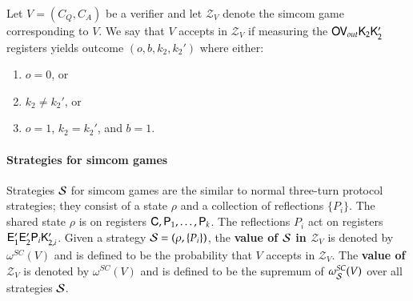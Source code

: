 Let $V = (C_Q,C_A)$ be a verifier and let $\mathscr{Z}_V$ denote the simcom game corresponding to $V$. We say that $V$ accepts in $\mathscr{Z}_V$ if measuring the ${\mathsf{O}} {\mathsf{V}}_{out} {\mathsf{K}}_2 {\mathsf{K}}_2'$ registers yields outcome $(o,b,k_2,k_2')$ where either:
\begin{enumerate}
	\item $o = 0$, or
	\item $k_2 \neq k_2'$, or
	\item $o = 1$, $k_2 = k_2'$, and $b = 1$.
\end{enumerate}

\paragraph{Strategies for simcom games} Strategies $\mathcal{S}$ for simcom games are the similar to normal three-turn protocol strategies; they consist of a state $\rho$ and a collection of reflections $\{ P_i \}$. The shared state $\rho$ is on registers ${\mathsf{C}}, {\mathsf{P}}_1,\ldots,{\mathsf{P}}_k$. The reflections $P_i$ act on registers ${\mathsf{E}}_1' {\mathsf{E}}_2' {\mathsf{P}}_i {\mathsf{K}}_{2,i}'$. Given a strategy $\mathcal{S} = (\rho,\{P_i\})$, the \textbf{value of $\mathcal{S}$ in $\mathscr{Z}_V$} is denoted by $\omega^{SC}(V)$ and is defined to be the probability that $V$ accepts in $\mathscr{Z}_V$. The \textbf{value of $\mathscr{Z}_V$} is denoted by $\omega^{SC}(V)$ and is defined to be the supremum of $\omega^{SC}_{\mathcal{S}}(V)$ over all strategies $\mathcal{S}$.

